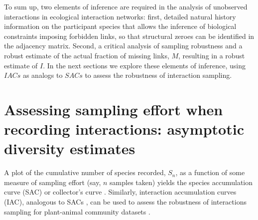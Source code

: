 \documentclass[12pt]{article}
\begin{document}

To sum up, two elements of inference are required in the analysis of unobserved interactions in ecological interaction networks: first, detailed natural history information on the participant species that allows the inference of biological constraints imposing forbidden links, so that structural zeroes can be identified in the adjacency matrix. Second, a critical analysis of sampling robustness and a robust estimate of the actual fraction of missing links, $M$, resulting in a robust estimate of $I$. In the next sections we explore these elements of inference, using $IACs$ as analogs to $SACs$ to assess the robustness of interaction sampling.

\section*{Assessing sampling effort when recording interactions: asymptotic diversity estimates}
\label{assessingsamplingeffortwhenrecordinginteractions}

A plot of the cumulative number of species recorded, $S_n$, as a function of some measure of sampling effort (say, $n$ samples taken) yields the species accumulation curve (SAC) or collector's curve \citep{Colwell:1994vt}. Similarly, interaction accumulation curves (IAC), analogous to SACs \citep{Gotelli:2001uo,Hortal:2006dc,Chao:2005wp,Colwell:2013kj}, can be used to assess the robustness of interactions sampling for plant-animal community datasets \citep{E31/2562,Jordano:2009c,Olesen:2011a,Chacoff:2012}.
\end{document}
